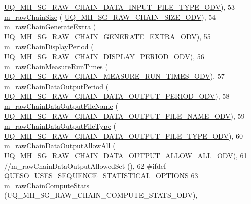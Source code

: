\begin{DoxyCode}
      \hyperlink{_metropolis_hastings_s_g_options_8h_af0e0783c36d4e6c0f791343418518ebf}{UQ\_MH\_SG\_RAW\_CHAIN\_DATA\_INPUT\_FILE\_TYPE\_ODV}),
53   \hyperlink{class_q_u_e_s_o_1_1_mh_options_values_a18dcb5898ba7101ae11856e866742aaf}{m\_rawChainSize}                             (
      \hyperlink{_metropolis_hastings_s_g_options_8h_a455df8cb3f749964def740f73227205d}{UQ\_MH\_SG\_RAW\_CHAIN\_SIZE\_ODV}),
54   \hyperlink{class_q_u_e_s_o_1_1_mh_options_values_a9d540978290d39df801e32f183450859}{m\_rawChainGenerateExtra}                    (
      \hyperlink{_metropolis_hastings_s_g_options_8h_a27bbd21c541a1a84270ce23b292cd635}{UQ\_MH\_SG\_RAW\_CHAIN\_GENERATE\_EXTRA\_ODV}),
55   \hyperlink{class_q_u_e_s_o_1_1_mh_options_values_a6d11f0ea62107b789da99befe29ebffa}{m\_rawChainDisplayPeriod}                    (
      \hyperlink{_metropolis_hastings_s_g_options_8h_ae37cce3b662f1c3b6e84d282c41a51a2}{UQ\_MH\_SG\_RAW\_CHAIN\_DISPLAY\_PERIOD\_ODV}),
56   \hyperlink{class_q_u_e_s_o_1_1_mh_options_values_a6fcc2efc9146b68548e62d707aeed883}{m\_rawChainMeasureRunTimes}                  (
      \hyperlink{_metropolis_hastings_s_g_options_8h_a980135370984a2685799c2e4fbda6585}{UQ\_MH\_SG\_RAW\_CHAIN\_MEASURE\_RUN\_TIMES\_ODV}),
57   \hyperlink{class_q_u_e_s_o_1_1_mh_options_values_ad838a3095d5158e27b9af55597822d31}{m\_rawChainDataOutputPeriod}                 (
      \hyperlink{_metropolis_hastings_s_g_options_8h_af23b7b773a696e3392ba2509803f7011}{UQ\_MH\_SG\_RAW\_CHAIN\_DATA\_OUTPUT\_PERIOD\_ODV}),
58   \hyperlink{class_q_u_e_s_o_1_1_mh_options_values_a0ff310cdab62e1bdbff8663f8a6b1c77}{m\_rawChainDataOutputFileName}               (
      \hyperlink{_metropolis_hastings_s_g_options_8h_abac180095636122dceb5407269fb701e}{UQ\_MH\_SG\_RAW\_CHAIN\_DATA\_OUTPUT\_FILE\_NAME\_ODV}),
59   \hyperlink{class_q_u_e_s_o_1_1_mh_options_values_ae435f8be38f9f6407a2e0f75c53b4e76}{m\_rawChainDataOutputFileType}               (
      \hyperlink{_metropolis_hastings_s_g_options_8h_ac16891b2289a371854fd32cc8fdecaa3}{UQ\_MH\_SG\_RAW\_CHAIN\_DATA\_OUTPUT\_FILE\_TYPE\_ODV}),
60   \hyperlink{class_q_u_e_s_o_1_1_mh_options_values_a7bd5a3926443946479ea617918d6723f}{m\_rawChainDataOutputAllowAll}               (
      \hyperlink{_metropolis_hastings_s_g_options_8h_a1c2ff5442dda1beb21610d94dfaa9a6f}{UQ\_MH\_SG\_RAW\_CHAIN\_DATA\_OUTPUT\_ALLOW\_ALL\_ODV}),
61 \textcolor{comment}{//m\_rawChainDataOutputAllowedSet             (),}
62 \textcolor{preprocessor}{#ifdef QUESO\_USES\_SEQUENCE\_STATISTICAL\_OPTIONS}
63 \textcolor{preprocessor}{}  m\_rawChainComputeStats                     (UQ\_MH\_SG\_RAW\_CHAIN\_COMPUTE\_STATS\_ODV),

\end{DoxyCode}
